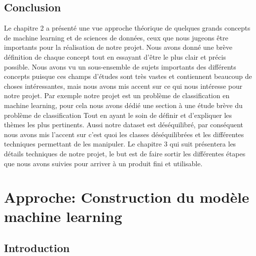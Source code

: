\documentclass[12pt, french]{report}
\begin{document}
\section{Conclusion}
Le chapitre 2 a présenté une vue approche théorique de quelques grands concepts de machine learning et de sciences de données, ceux que nous jugeons être importants pour la réalisation de notre projet. Nous avons donné une brève définition de chaque concept tout en essayant d'être le plus clair et précis possible. Nous avons vu un sous-ensemble de sujets importants des différents concepts puisque ces champs d'études sont très vastes et contiennent beaucoup de choses intéressantes, mais nous avons mis accent sur ce qui nous intéresse pour notre projet. Par exemple notre projet est un problème de classification en machine learning, pour cela nous avons dédié une section à une étude brève du problème de classification Tout en ayant le soin de définir et d'expliquer les thèmes les plus pertinents. Aussi notre dataset est déséquilibré, par conséquent nous avons mis l'accent sur c'est quoi les classes déséquilibrées et les différentes techniques permettant de les manipuler. Le chapitre 3 qui suit présentera les détails techniques de notre projet, le but est de faire sortir les différentes étapes que nous avons suivies pour arriver à un produit fini et utilisable.

 




%
%
%
%
%



\newpage

\chapter{Approche: Construction du modèle machine learning}
\section{Introduction}
\end{document}
